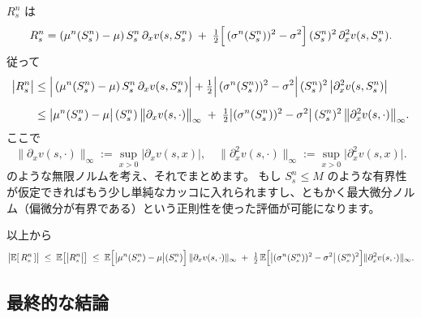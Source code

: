 \documentclass[a4paper]{jsarticle}
\begin{document}
$R_s^n$ は  
\[  
  R_s^n  
  =  
  (\mu^n(S_s^n) - \mu)\,S_s^n\,\partial_x v(s,S_s^n)  
  \;+\;  
  \tfrac12  
  \Bigl[\,(\sigma^n(S_s^n))^2 - \sigma^2\Bigr]\,(S_s^n)^2  
         \,\partial_x^2 v(s,S_s^n).  
\]  
従って  
\begin{align*}  
  \bigl|R_s^n\bigr|  
  &\le  
  \Bigl|\,(\mu^n(S_s^n) - \mu)\,S_s^n\,\partial_x v(s,S_s^n)\Bigr|  
  +  
  \tfrac12  
  \Bigl|\,(\sigma^n(S_s^n))^2 - \sigma^2\Bigr|\,(S_s^n)^2  
  \,\bigl|\partial_x^2 v(s,S_s^n)\bigr|  
  \\[6pt]  
  &\le  
  \bigl|\mu^n(S_s^n) - \mu\bigr|\,(S_s^n)\,\bigl\|\partial_x v(s,\cdot)\bigr\|_\infty  
  \;+\;  
  \tfrac12  
  \bigl|(\sigma^n(S_s^n))^2 - \sigma^2\bigr|\,(S_s^n)^2  
  \,\bigl\|\partial_x^2 v(s,\cdot)\bigr\|_\infty.  
\end{align*}  
ここで  
\[  
  \|\partial_x v(s,\cdot)\|_\infty  
  :=  
  \sup_{x>0} \bigl|\partial_x v(s,x)\bigr|,  
  \quad  
  \|\partial_x^2 v(s,\cdot)\|_\infty  
  :=  
  \sup_{x>0} \bigl|\partial_x^2 v(s,x)\bigr|.  
\]  
のような無限ノルムを考え、それでまとめます。  
もし $S_s^n \le M$ のような有界性が仮定できればもう少し単純なカッコに入れられますし、ともかく最大微分ノルム（偏微分が有界である）という正則性を使った評価が可能になります。  

以上から  
\[  
  \bigl|\mathbb{E}[\,R_s^n\,]\bigr|  
  \;\le\;  
  \mathbb{E}\bigl[\bigl|R_s^n\bigr|\bigr]  
  \;\le\;  
  \mathbb{E}\Bigl[  
    \bigl|\mu^n(S_s^n) - \mu\bigr|(S_s^n)  
  \Bigr]\,  
  \|\partial_x v(s,\cdot)\|_\infty  
  \;+\;  
  \tfrac12\,  
  \mathbb{E}\Bigl[  
    \bigl|(\sigma^n(S_s^n))^2 - \sigma^2\bigr|\,(S_s^n)^2\Bigr]  
  \|\partial_x^2 v(s,\cdot)\|_\infty.  
\]  

\subsection{最終的な結論}  
\end{document}
